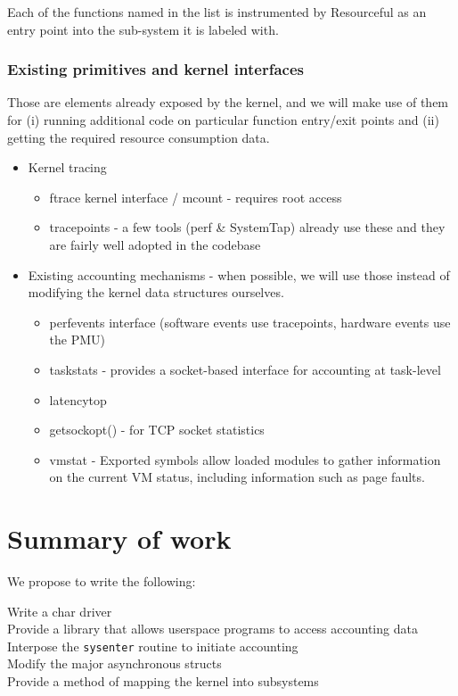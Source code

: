 \documentclass[12pt]{article}
\def\_{\textunderscore\-}
\begin{document}
  Each of the functions named in the list is instrumented by Resourceful as an entry point into the sub-system it is labeled with.
  
  \subsubsection{Existing primitives and kernel interfaces}
  Those are elements already exposed by the kernel, and we will make use of them for (i) running additional code on particular function entry/exit points and (ii) getting the required resource consumption data.
  
  \begin{itemize}
  \item Kernel tracing
  	\begin{itemize}
  	\item ftrace kernel interface / mcount - requires root access
  	\item tracepoints - a few tools (perf \& SystemTap) already use these and they are fairly well adopted in the codebase
  	\end{itemize}
  \item Existing accounting mechanisms - when possible, we will use those instead of modifying the kernel data structures ourselves.
  	\begin{itemize}
  	\item perf\_events interface (software events use tracepoints, hardware events use the PMU)
  	\item taskstats \cite{taskstats} - provides a socket-based interface for accounting at task-level
  	\item latencytop \cite{latencytop}
  	\item getsockopt() - for TCP socket statistics
  	\item vmstat - Exported symbols allow loaded modules to gather information on the current VM status, including information such as page faults.
  	\end{itemize}
  \end{itemize}

  \section{Summary of work}

  We propose to write the following:
  \begin{description}
  \item[Write a char driver]
  \item[Provide a library that allows userspace programs to access accounting data]
  \item[Interpose the \texttt{sysenter} routine to initiate accounting]
  \item[Modify the major asynchronous structs]
  \item[Provide a method of mapping the kernel into subsystems]
  \end{description}
\end{document}
